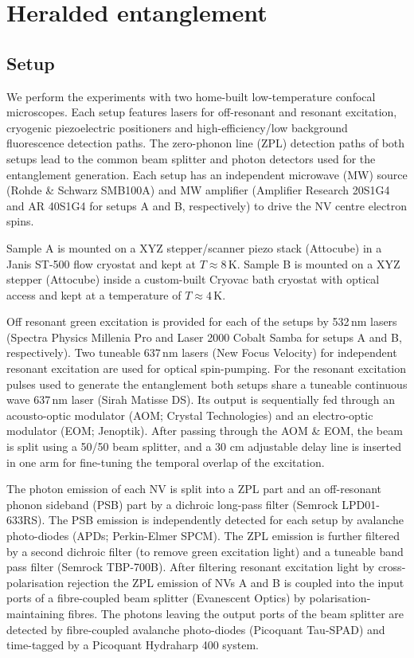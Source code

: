 

\graphicspath{{./ch_LDE_SI/figures/}}

\chapter{Heralded entanglement}
\label{ch:LDEappendix}


\section{Setup}
We perform the experiments with two home-built low-temperature confocal microscopes. Each setup features lasers for off-resonant and resonant excitation, cryogenic piezoelectric positioners and high-efficiency/low background fluorescence detection paths. The zero-phonon line (ZPL) detection paths of both setups lead to the common beam splitter and photon detectors used for the entanglement generation. Each setup has an independent microwave (MW) source (Rohde \& Schwarz SMB100A) and MW amplifier (Amplifier Research 20S1G4 and AR 40S1G4 for setups A and B, respectively) to drive the NV centre electron spins.

Sample A is mounted on a XYZ stepper/scanner piezo stack (Attocube) in a Janis ST-500 flow cryostat and kept at $T \approx 8$\,K. Sample B is mounted on a XYZ stepper (Attocube) inside a custom-built Cryovac bath cryostat with optical access and kept at a temperature of $T \approx 4$\,K. 

Off resonant green excitation is provided for each of the setups by 532\,nm lasers (Spectra Physics Millenia Pro and Laser 2000 Cobalt Samba for setups A and B, respectively). Two tuneable 637\,nm lasers (New Focus Velocity) for independent resonant excitation are used for optical spin-pumping. For  the resonant excitation pulses used to generate the entanglement both setups share a tuneable continuous wave 637\,nm laser (Sirah Matisse DS). Its output is sequentially fed through an acousto-optic modulator (AOM; Crystal Technologies) and an electro-optic modulator (EOM; Jenoptik). After passing through the AOM \& EOM, the beam is split using a 50/50 beam splitter, and a 30 cm adjustable delay line is inserted in one arm for fine-tuning the temporal overlap of the excitation.

The photon emission of each NV is split into a ZPL part and an off-resonant phonon sideband (PSB) part by a dichroic long-pass filter (Semrock LPD01-633RS). The PSB emission is independently detected for each setup by avalanche photo-diodes (APDs; Perkin-Elmer SPCM). The ZPL emission is further filtered by a second dichroic filter (to remove green excitation light) and a tuneable band pass filter (Semrock TBP-700B). After filtering resonant excitation light by cross-polarisation rejection the ZPL emission of NVs A and B is coupled into the input ports of a fibre-coupled beam splitter (Evanescent Optics) by polarisation-maintaining fibres. The photons leaving the output ports of the beam splitter are detected by fibre-coupled avalanche photo-diodes (Picoquant Tau-SPAD) and time-tagged by a Picoquant Hydraharp 400 system.

